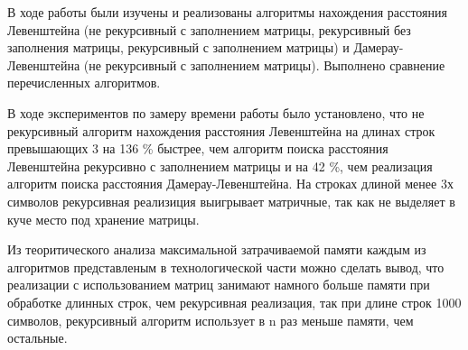 \Conclusion
    В ходе работы были изучены и реализованы алгоритмы нахождения
    расстояния Левенштейна (не рекурсивный с заполнением матрицы,
    рекурсивный без заполнения матрицы, рекурсивный с заполнением матрицы)
    и Дамерау-Левенштейна (не рекурсивный с заполнением матрицы). 
    Выполнено сравнение перечисленных алгоритмов. 
    
    В ходе экспериментов по замеру времени работы было установлено, что не рекурсивный алгоритм нахождения расстояния Левенштейна
    на длинах строк превышающих 3 на 136 \% быстрее, чем алгоритм поиска
    расстояния Левенштейна рекурсивно с заполнением матрицы и на 42 \%,
    чем реализация алгоритм поиска расстояния Дамерау-Левенштейна. На строках
    длиной менее 3х символов рекурсивная реализиция выигрывает матричные, так
    как не выделяет в куче место под хранение матрицы.
    
    Из теоритического анализа максимальной затрачиваемой памяти каждым из алгоритмов 
    представленым в технологической части можно сделать вывод, что реализации
    с использованием матриц занимают намного больше памяти при обработке
    длинных строк, чем рекурсивная реализация, так при длине строк 1000
    символов, рекурсивный алгоритм использует в n раз меньше памяти, чем остальные.
